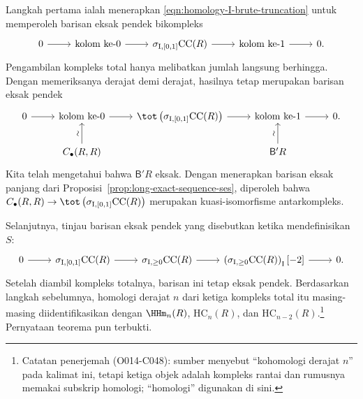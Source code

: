 \begin{bukti}
	Langkah pertama ialah menerapkan
	\eqref{eqn:homology-I-brute-truncation} untuk memperoleh barisan eksak
	pendek bikompleks
	\[\begin{tikzcd}
		0 \arrow[r] & \text{kolom ke-$0$} \arrow[r]
		& \sigma_{\mathrm{I},[0,1]}\mathrm{CC}(R) \arrow[r]
		& \text{kolom ke-$1$} \arrow[r] & 0 .
	\end{tikzcd}\]
	Pengambilan kompleks total hanya melibatkan jumlah langsung berhingga.
	Dengan memeriksanya derajat demi derajat, hasilnya tetap merupakan
	barisan eksak pendek
	\[\begin{tikzcd}
		0 \arrow[r] & \text{kolom ke-$0$} \arrow[r]
		& \tot\left(\sigma_{\mathrm{I},[0,1]}\mathrm{CC}(R)\right)
		\arrow[r] & \text{kolom ke-$1$} \arrow[r] & 0.\\
		& C_\bullet(R,R) \arrow[u,"\sim" sloped]
		& & \mathsf{B}'R \arrow[u,"\sim" sloped] &
	\end{tikzcd}\]
	Kita telah mengetahui bahwa $\mathsf{B}'R$ eksak. Dengan menerapkan
	barisan eksak panjang dari
	Proposisi~\ref{prop:long-exact-sequence-ses}, diperoleh bahwa
	$C_\bullet(R,R)\to
	\tot\left(\sigma_{\mathrm{I},[0,1]}\mathrm{CC}(R)\right)$ merupakan
	kuasi-isomorfisme antarkompleks.

	Selanjutnya, tinjau barisan eksak pendek yang disebutkan ketika
	mendefinisikan $S$:
	\[\begin{tikzcd}
		0 \arrow[r] & \sigma_{\mathrm{I},[0,1]}\mathrm{CC}(R) \arrow[r]
		& \sigma_{\mathrm{I},\geq0}\mathrm{CC}(R) \arrow[r]
		& \left(\sigma_{\mathrm{I},\geq0}\mathrm{CC}(R)\right)_{\mathrm{I}}[-2]
		\arrow[r] & 0 .
	\end{tikzcd}\]
	Setelah diambil kompleks totalnya, barisan ini tetap eksak pendek.
	Berdasarkan langkah sebelumnya, homologi derajat $n$ dari ketiga kompleks
	total itu masing-masing diidentifikasikan dengan
	$\HHm_n(R)$, $\mathrm{HC}_n(R)$, dan $\mathrm{HC}_{n-2}(R)$.\footnote{
	Catatan penerjemah (O014-C048): sumber menyebut ``kohomologi derajat $n$'' pada
	kalimat ini, tetapi ketiga objek adalah kompleks rantai dan rumusnya
	memakai subskrip homologi; ``homologi'' digunakan di sini.}
	Pernyataan teorema pun terbukti.
\end{bukti}

